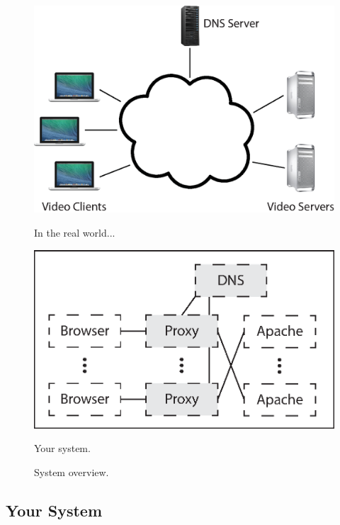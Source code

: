 \documentclass{article}
\begin{document}
\begin{figure}
	\centering
	\begin{minipage}{0.4\textwidth}
		\includegraphics[width=\columnwidth]{figs/overview-real.eps}
		\caption{In the real world...}
		\label{fig:overview-real}
	\end{minipage}
	\hfill
	\begin{minipage}{0.4\textwidth}
		\includegraphics[width=\columnwidth]{figs/overview-fake.eps}
		\caption{Your system.}
		\label{fig:overview-fake}
	\end{minipage}

	\caption{System overview.}
	\label{fig:overview}
\end{figure}

\subsection{Your System}
\end{document}
